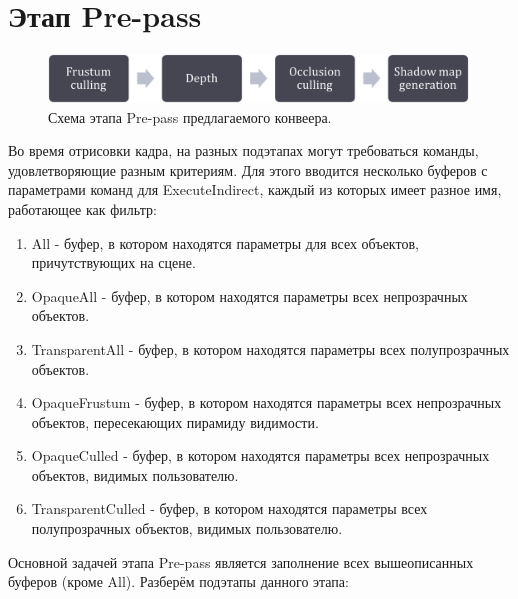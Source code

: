 \section{Этап Pre-pass} \label{ch3:pre_pass}
	\begin{figure}[ht!] 
		\center
		\includegraphics [scale=0.4] {my_folder/images//prepass_schema}	
		\caption{Схема этапа Pre-pass предлагаемого конвеера.} 
		\label{fig:prepass_schema}
	\end{figure}
	
	Во время отрисовки кадра, на разных подэтапах могут требоваться команды, удовлетворяющие разным критериям. Для этого вводится несколько буферов с параметрами команд для ExecuteIndirect, каждый из которых имеет разное имя, работающее как фильтр:
	\begin{enumerate}[1.]
		\item All - буфер, в котором находятся параметры для всех объектов, причутствующих на сцене.
		\item OpaqueAll - буфер, в котором находятся параметры всех непрозрачных объектов.
		\item TransparentAll - буфер, в котором находятся параметры всех полупрозрачных объектов.
		\item OpaqueFrustum - буфер, в котором находятся параметры всех непрозрачных объектов, пересекающих пирамиду видимости.
		\item OpaqueCulled - буфер, в котором находятся параметры всех непрозрачных объектов, видимых пользователю.
		\item TransparentCulled - буфер, в котором находятся параметры всех полупрозрачных объектов, видимых пользователю.
	\end{enumerate}
	
	Основной задачей этапа Pre-pass является заполнение всех вышеописанных буферов (кроме All). Разберём подэтапы данного этапа:
